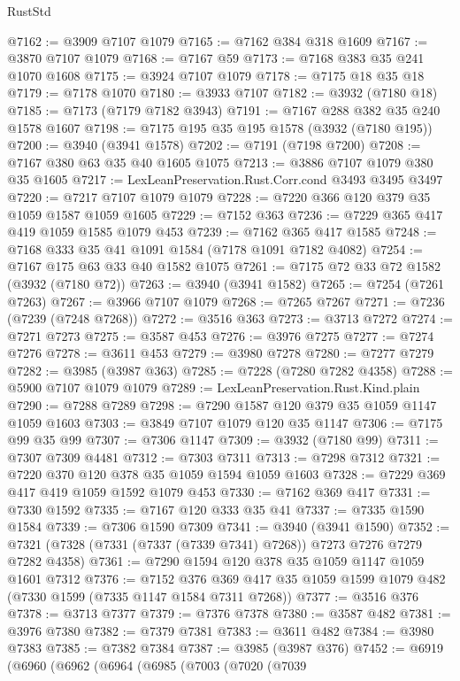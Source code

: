 \begin{lexlean}{RustStd}
\begin{coremodule}
@7162 := @3909 @7107 @1079
@7165 := @7162 @384 @318 @1609
@7167 := @3870 @7107 @1079
@7168 := @7167 @59
@7173 := @7168 @383 @35 @241 @1070 @1608
@7175 := @3924 @7107 @1079
@7178 := @7175 @18 @35 @18
@7179 := @7178 @1070
@7180 := @3933 @7107
@7182 := @3932 (@7180 @18)
@7185 := @7173 (@7179 @7182 @3943)
@7191 := @7167 @288 @382 @35 @240 @1578 @1607
@7198 := @7175 @195 @35 @195 @1578 (@3932 (@7180 @195))
@7200 := @3940 (@3941 @1578)
@7202 := @7191 (@7198 @7200)
@7208 := @7167 @380 @63 @35 @40 @1605 @1075
@7213 := @3886 @7107 @1079 @380 @35 @1605
@7217 := LexLeanPreservation.Rust.Corr.cond @3493 @3495 @3497
@7220 := @7217 @7107 @1079 @1079
@7228 := @7220 @366 @120 @379 @35 @1059 @1587 @1059 @1605
@7229 := @7152 @363
@7236 := @7229 @365 @417 @419 @1059 @1585 @1079 @453
@7239 := @7162 @365 @417 @1585
@7248 := @7168 @333 @35 @41 @1091 @1584 (@7178 @1091 @7182 @4082)
@7254 := @7167 @175 @63 @33 @40 @1582 @1075
@7261 := @7175 @72 @33 @72 @1582 (@3932 (@7180 @72))
@7263 := @3940 (@3941 @1582)
@7265 := @7254 (@7261 @7263)
@7267 := @3966 @7107 @1079
@7268 := @7265 @7267
@7271 := @7236 (@7239 (@7248 @7268))
@7272 := @3516 @363
@7273 := @3713 @7272
@7274 := @7271 @7273
@7275 := @3587 @453
@7276 := @3976 @7275
@7277 := @7274 @7276
@7278 := @3611 @453
@7279 := @3980 @7278
@7280 := @7277 @7279
@7282 := @3985 (@3987 @363)
@7285 := @7228 (@7280 @7282 @4358)
@7288 := @5900 @7107 @1079 @1079
@7289 := LexLeanPreservation.Rust.Kind.plain
@7290 := @7288 @7289
@7298 := @7290 @1587 @120 @379 @35 @1059 @1147 @1059 @1603
@7303 := @3849 @7107 @1079 @120 @35 @1147
@7306 := @7175 @99 @35 @99
@7307 := @7306 @1147
@7309 := @3932 (@7180 @99)
@7311 := @7307 @7309 @4481
@7312 := @7303 @7311
@7313 := @7298 @7312
@7321 := @7220 @370 @120 @378 @35 @1059 @1594 @1059 @1603
@7328 := @7229 @369 @417 @419 @1059 @1592 @1079 @453
@7330 := @7162 @369 @417
@7331 := @7330 @1592
@7335 := @7167 @120 @333 @35 @41
@7337 := @7335 @1590 @1584
@7339 := @7306 @1590 @7309
@7341 := @3940 (@3941 @1590)
@7352 := @7321 (@7328 (@7331 (@7337 (@7339 @7341) @7268)) @7273 @7276 @7279 @7282 @4358)
@7361 := @7290 @1594 @120 @378 @35 @1059 @1147 @1059 @1601 @7312
@7376 := @7152
    @376
    @369
    @417
    @35
    @1059
    @1599
    @1079
    @482
    (@7330 @1599 (@7335 @1147 @1584 @7311 @7268))
@7377 := @3516 @376
@7378 := @3713 @7377
@7379 := @7376 @7378
@7380 := @3587 @482
@7381 := @3976 @7380
@7382 := @7379 @7381
@7383 := @3611 @482
@7384 := @3980 @7383
@7385 := @7382 @7384
@7387 := @3985 (@3987 @376)
@7452 := @6919
    (@6960
      (@6962
        (@6964
          (@6985
            (@7003
              (@7020
                (@7039

\end{coremodule}
\end{lexlean}
